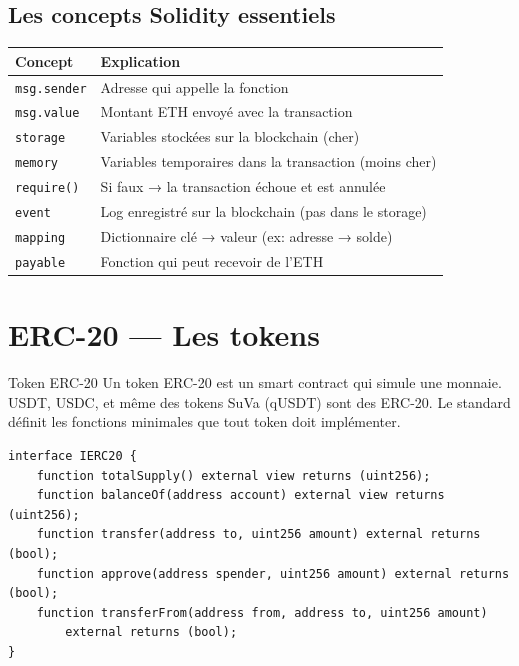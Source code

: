 \documentclass[12pt, a4paper]{article}
\begin{document}
\subsection{Les concepts Solidity essentiels}

\begin{center}
\renewcommand{\arraystretch}{1.4}
\begin{tabular}{lp{9cm}}
  \toprule
  \textbf{Concept} & \textbf{Explication} \\
  \midrule
  \texttt{msg.sender} & Adresse qui appelle la fonction \\
  \texttt{msg.value} & Montant ETH envoyé avec la transaction \\
  \texttt{storage} & Variables stockées sur la blockchain (cher) \\
  \texttt{memory} & Variables temporaires dans la transaction (moins cher) \\
  \texttt{require()} & Si faux → la transaction échoue et est annulée \\
  \texttt{event} & Log enregistré sur la blockchain (pas dans le storage) \\
  \texttt{mapping} & Dictionnaire clé → valeur (ex: adresse → solde) \\
  \texttt{payable} & Fonction qui peut recevoir de l'ETH \\
  \bottomrule
\end{tabular}
\end{center}

\section{ERC-20 --- Les tokens}

\begin{definition}{Token ERC-20}
Un token ERC-20 est un smart contract qui simule une monnaie. USDT, USDC, et même
des tokens SuVa (qUSDT) sont des ERC-20. Le standard définit les fonctions minimales
que tout token doit implémenter.
\end{definition}

\begin{lstlisting}[style=solidity, caption={Interface ERC-20 minimale}]
interface IERC20 {
    function totalSupply() external view returns (uint256);
    function balanceOf(address account) external view returns (uint256);
    function transfer(address to, uint256 amount) external returns (bool);
    function approve(address spender, uint256 amount) external returns (bool);
    function transferFrom(address from, address to, uint256 amount)
        external returns (bool);
}
\end{lstlisting}
\end{document}
